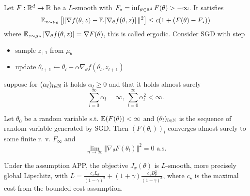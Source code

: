 \begin{theorem}\label{thm:59}
    Let \(F:\mathbb{R}^d\to\mathbb{R}\) be a \(L\)-smooth with \(F_\star=\inf_{\theta\in\mathbb{R}^d}F(\theta)>-\infty\).
    It satisfies 
    \[\mathbb{E}_{z\sim \mu_\theta}\left[\Vert \nabla f(\theta,z)-\mathbb{E}\left[\nabla_\theta f(\theta,z)\right]\Vert^2\right]\leq c(1+(F(\theta)-F_\star))\] 
    where \(\mathbb{E}_{z\sim \mu_\theta}\left[\nabla_\theta f(\theta,z)\right]=\nabla F(\theta)\), this is called ergodic.
    Consider SGD with step 
    \begin{itemize}
        \item sample \(z_{+1}\) from \(\mu_\theta\) %
        \item update \(\theta_{l+1}\leftarrow \theta_l-\alpha \nabla_\theta f(\theta_l,z_{l+1})\)
    \end{itemize}
    suppose for \((\alpha_l)_{l\in \mathbb{N}}\) it holds \(\alpha_l\geq 0\) and that it holds almost surely 
    \[\sum_{l=0}^{\infty}\alpha_l=\infty,\ \sum_{l=0}^{\infty}\alpha_l^2<\infty.\]
    
    Let \(\theta_0\) be a random variable s.t. \(\mathbb{E}(F(\theta))<\infty\) and \((\theta_l)_{l\in\mathbb{N}}\)
    is the sequence of random variable generated by SGD. Then \((F({\theta_l}))_l\) converges almost surely 
    to some finite r. v. \(F_\infty\) and 
    \[\lim_{n\to\infty}\Vert \nabla_\theta F(\theta_l)\Vert^2=0\text{ a.s.}\] 
\end{theorem}

\begin{lemma}\label{lem:60} %
    Under the assumption APP, the objective \(J_x(\theta)\) is \(L\)-smooth, more precisely global Lipschitz, with 
    \(L=\frac{c_\star L_\theta}{(1-\gamma)^2}+(1+\gamma)\frac{c_\star B_\theta^2}{(1-\gamma)^3}\),
    where \(c_\star\) is the maximal cost from the bounded cost assumption.
\end{lemma}


